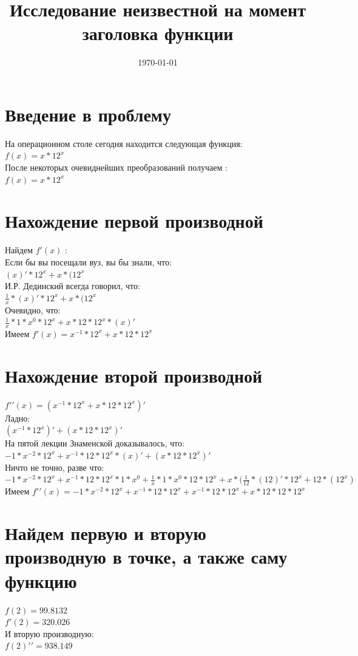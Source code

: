 \documentclass[a4paper]{article}
\title{Исследование неизвестной на момент заголовка функции}
\date{\today}
\begin{document}
\maketitle
\section{Введение в проблему}
На операционном столе сегодня находится следующая функция:\\
$f(x) = x*12^{x}$\\
После некоторых очевиднейших преобразований получаем :\\
$f(x) = x*12^{x}$\\
\section{Нахождение первой производной}
Найдем $f\prime(x)$ :\\Если бы вы посещали вуз, вы бы знали, что:\\
$(x)\prime *12^{x}+x*(12^{x}$\\
И.Р. Дединский всегда говорил, что:\\
$\frac{1}{x}*(x)\prime *12^{x}+x*(12^{x}$\\
Очевидно, что:\\
$\frac{1}{x}*1*x^{0}*12^{x}+x*12*12^{x}*(x)\prime $\\
Имеем $f\prime(x) = x^{-1}*12^{x}+x*12*12^{x}$\\
\section{Нахождение второй производной}
$f\prime\prime(x) = (x^{-1}*12^{x}+x*12*12^{x})\prime $\\ 
Ладно:\\
$(x^{-1}*12^{x})\prime +(x*12*12^{x})\prime $\\
На пятой лекции Знаменской доказывалось, что:\\
$-1*x^{-2}*12^{x}+x^{-1}*12*12^{x}*(x)\prime +(x*12*12^{x})\prime $\\
Ничто не точно, разве что:\\
$-1*x^{-2}*12^{x}+x^{-1}*12*12^{x}*1*x^{0}+\frac{1}{x}*1*x^{0}*12*12^{x}+x*(\frac{1}{12}*(12)\prime *12^{x}+12*(12^{x})$\\
Имеем $f\prime\prime(x) = -1*x^{-2}*12^{x}+x^{-1}*12*12^{x}+x^{-1}*12*12^{x}+x*12*12*12^{x}$\\
\section{Найдем первую и вторую производную в точке, а также саму функцию}
$f(2) = 99.8132$\\
$f\prime(2) = 320.026 $\\
И вторую производную: \\ 
$f(2)\prime\prime = 938.149$ \\
\end{document}
